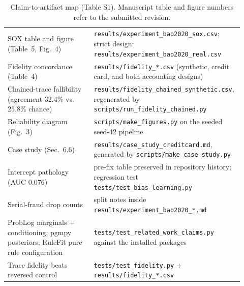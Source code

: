 \documentclass[11pt]{article}
\begin{document}
\begin{table}[h]
{\begin{tabular}{p{0.36\linewidth}p{0.56\linewidth}}
SOX table and figure (Table~5, Fig.~4) & \texttt{results/experiment\_bao2020\_sox.csv}; strict design: \texttt{results/experiment\_bao2020\_real.csv}\\
Fidelity concordance (Table~4) & \texttt{results/fidelity\_*.csv} (synthetic, credit card, and both accounting designs)\\
Chained-trace fallibility (agreement $32.4\%$ vs.\ $25.8\%$ chance) & \texttt{results/fidelity\_chained\_synthetic.csv}, regenerated by \texttt{scripts/run\_fidelity\_chained.py}\\
Reliability diagram (Fig.~3) & \texttt{scripts/make\_figures.py} on the seeded seed-42 pipeline\\
Case study (Sec.~6.6) & \texttt{results/case\_study\_creditcard.md}, generated by \texttt{scripts/make\_case\_study.py}\\
Intercept pathology (AUC $0.076$) & pre-fix table preserved in repository history; regression test \texttt{tests/test\_bias\_learning.py}\\
Serial-fraud drop counts & split notes inside \texttt{results/experiment\_bao2020\_*.md}\\
ProbLog marginals + conditioning; pgmpy posteriors; RuleFit pure-rule configuration & \texttt{tests/test\_related\_work\_claims.py} against the installed packages\\
Trace fidelity beats reversed control & \texttt{tests/test\_fidelity.py} + \texttt{results/fidelity\_*.csv}\\
\bottomrule
\end{tabular}}
\caption{Claim-to-artifact map (Table S1). Manuscript table and figure
numbers refer to the submitted revision.}
\label{tab:provenance}
\end{table}
\end{document}
